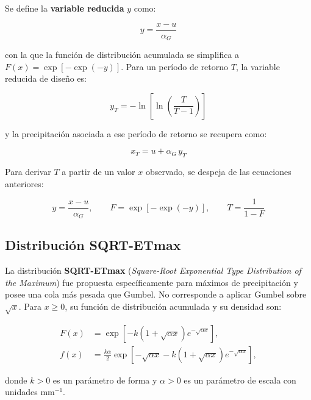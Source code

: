 \documentclass[11pt]{article}
\begin{document}
Se define la \textbf{variable reducida} $y$ como:

\begin{equation}
  y = \frac{x - u}{\alpha_G}
  \label{eq:y_reducida}
\end{equation}

con la que la función de distribución acumulada se simplifica a
$F(x) = \exp[-\exp(-y)]$.
Para un período de retorno $T$, la variable reducida de diseño es:

\begin{equation}
  y_T = -\ln\!\left[\ln\!\left(\frac{T}{T-1}\right)\right]
  \label{eq:y_T}
\end{equation}

y la precipitación asociada a ese período de retorno se recupera como:

\begin{equation}
  x_T = u + \alpha_G\,y_T
  \label{eq:xT}
\end{equation}

Para derivar $T$ a partir de un valor $x$ observado, se despeja de las ecuaciones
anteriores:

\begin{equation}
  y = \frac{x - u}{\alpha_G}, \qquad
  F = \exp[-\exp(-y)], \qquad
  T = \frac{1}{1-F}
  \label{eq:T_desde_x}
\end{equation}

\subsection*{Distribución SQRT-ETmax}

La distribución \textbf{SQRT-ETmax} (\emph{Square-Root Exponential Type
Distribution of the Maximum}) fue propuesta específicamente para máximos de
precipitación y posee una cola más pesada que Gumbel. No corresponde a aplicar
Gumbel sobre $\sqrt{x}$. Para $x\geq0$, su función de distribución acumulada y
su densidad son:

\begin{align}
 F(x)&=\exp\!\left[-k\left(1+\sqrt{\alpha x}\right)
        e^{-\sqrt{\alpha x}}\right], \label{eq:sqrt_cdf}\\
 f(x)&=\frac{k\alpha}{2}\exp\!\left[-\sqrt{\alpha x}
        -k\left(1+\sqrt{\alpha x}\right)e^{-\sqrt{\alpha x}}\right],
        \label{eq:sqrt_pdf}
\end{align}

donde $k>0$ es un parámetro de forma y $\alpha>0$ es un parámetro de escala
con unidades $\mathrm{mm}^{-1}$.
\end{document}
